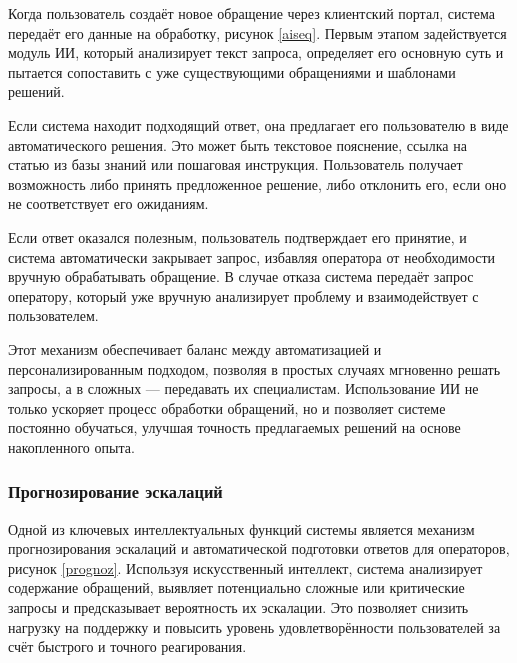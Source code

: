 Когда пользователь создаёт новое обращение через клиентский портал, система передаёт его данные на обработку, рисунок \ref{aiseq}. Первым этапом задействуется модуль ИИ, который анализирует текст запроса, определяет его основную суть и пытается сопоставить с уже существующими обращениями и шаблонами решений.


Если система находит подходящий ответ, она предлагает его пользователю в виде автоматического решения. Это может быть текстовое пояснение, ссылка на статью из базы знаний или пошаговая инструкция. Пользователь получает возможность либо принять предложенное решение, либо отклонить его, если оно не соответствует его ожиданиям.

Если ответ оказался полезным, пользователь подтверждает его принятие, и система автоматически закрывает запрос, избавляя оператора от необходимости вручную обрабатывать обращение. В случае отказа система передаёт запрос оператору, который уже вручную анализирует проблему и взаимодействует с пользователем.

Этот механизм обеспечивает баланс между автоматизацией и персонализированным подходом, позволяя в простых случаях мгновенно решать запросы, а в сложных — передавать их специалистам. Использование ИИ не только ускоряет процесс обработки обращений, но и позволяет системе постоянно обучаться, улучшая точность предлагаемых решений на основе накопленного опыта.

\subsubsection{Прогнозирование эскалаций}

Одной из ключевых интеллектуальных функций системы является механизм прогнозирования эскалаций и автоматической подготовки ответов для операторов, рисунок \ref{prognoz}. Используя искусственный интеллект, система анализирует содержание обращений, выявляет потенциально сложные или критические запросы и предсказывает вероятность их эскалации. Это позволяет снизить нагрузку на поддержку и повысить уровень удовлетворённости пользователей за счёт быстрого и точного реагирования.


